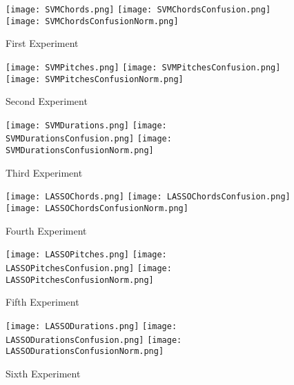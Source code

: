 \documentclass[twocolumn,dvipsnames]{article}
\begin{document}
\begin{figure}
    \centering
    \texttt{[image: SVMChords.png]}
    \texttt{[image: SVMChordsConfusion.png]}
    \texttt{[image: SVMChordsConfusionNorm.png]}
    \caption{First Experiment}\label{fig:exp1}
\end{figure}

\begin{figure}
    \centering
    \texttt{[image: SVMPitches.png]}
    \texttt{[image: SVMPitchesConfusion.png]}
    \texttt{[image: SVMPitchesConfusionNorm.png]}
    \caption{Second Experiment}\label{fig:exp2}
\end{figure}

\begin{figure}
    \centering
    \texttt{[image: SVMDurations.png]}
    \texttt{[image: SVMDurationsConfusion.png]}
    \texttt{[image: SVMDurationsConfusionNorm.png]}
    \caption{Third Experiment}\label{fig:exp3}
\end{figure}

\begin{figure}
    \centering
    \texttt{[image: LASSOChords.png]}
    \texttt{[image: LASSOChordsConfusion.png]}
    \texttt{[image: LASSOChordsConfusionNorm.png]}
    \caption{Fourth Experiment}\label{fig:exp4}
\end{figure}

\begin{figure}
    \centering
    \texttt{[image: LASSOPitches.png]}
    \texttt{[image: LASSOPitchesConfusion.png]}
    \texttt{[image: LASSOPitchesConfusionNorm.png]}
    \caption{Fifth Experiment}\label{fig:exp5}
\end{figure}

\begin{figure}
    \centering
    \texttt{[image: LASSODurations.png]}
    \texttt{[image: LASSODurationsConfusion.png]}
    \texttt{[image: LASSODurationsConfusionNorm.png]}
    \caption{Sixth Experiment}\label{fig:exp6}
\end{figure}

\printbibliography[]
\end{document}
